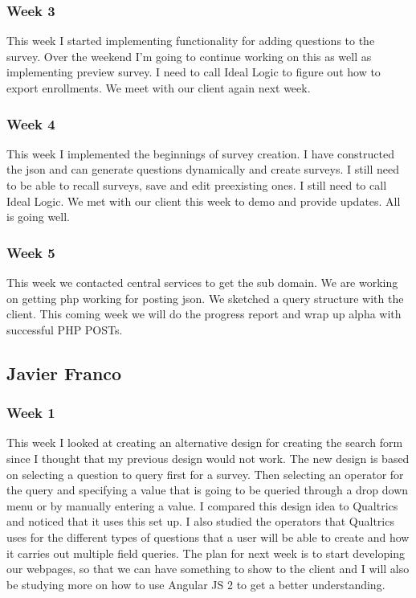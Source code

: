 \documentclass[letterpaper,10pt,serif, draftclsnofoot,onecolumn, compsoc, titlepage]{IEEEtran}
\begin{document}
\subsubsection{Week 3}
This week I started implementing functionality for adding questions to the survey.
Over the weekend I'm going to continue working on this as well as implementing preview survey.
I need to call Ideal Logic to figure out how to export enrollments.
We meet with our client again next week.
\subsubsection{Week 4}
This week I implemented the beginnings of survey creation.
I have constructed the json and can generate questions dynamically and create surveys.
I still need to be able to recall surveys, save and edit preexisting ones.
I still need to call Ideal Logic. We met with our client this week to demo and provide updates.
All is going well.
\subsubsection{Week 5}
This week we contacted central services to get the sub domain.
We are working on getting php working for posting json.
We sketched a query structure with the client.
This coming week we will do the progress report and wrap up alpha with successful PHP POSTs.

\subsection{Javier Franco}
\subsubsection{Week 1}
This week I looked at creating an alternative design for creating the search form since I thought that my previous design would not work.
The new design is based on selecting a question to query first for a survey.
Then selecting an operator for the query and specifying a value that is going to be queried through a drop down menu or by manually entering a value.
I compared this design idea to Qualtrics and noticed that it uses this set up.
I also studied the operators that Qualtrics uses for the different types of questions that a user will be able to create and how it carries out multiple field queries.
The plan for next week is to start developing our webpages, so that we can have something to show to the client and I will also be studying more on how to use Angular JS 2 to get a better understanding.
\end{document}
